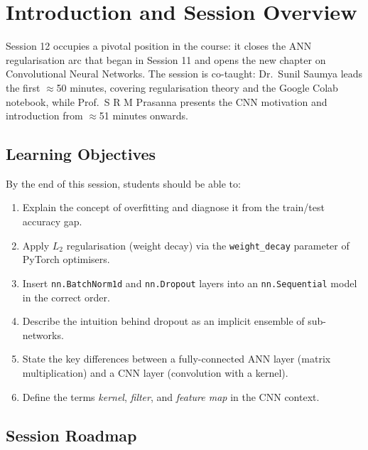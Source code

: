 \documentclass[12pt,a4paper]{article}
\newcommand{\Ltwo}{L_2}
\begin{document}
\tableofcontents
\newpage

\section{Introduction and Session Overview}
\label{sec:intro}

Session 12 occupies a pivotal position in the course: it closes the ANN
regularisation arc that began in Session 11 and opens the new chapter on
Convolutional Neural Networks.  The session is co-taught:
Dr.\ Sunil Saumya leads the first $\approx$50 minutes, covering regularisation
theory and the Google Colab notebook, while Prof.\ S R M Prasanna presents the
CNN motivation and introduction from $\approx$51 minutes onwards.

\subsection{Learning Objectives}
\label{sec:intro:objectives}

By the end of this session, students should be able to:

\begin{enumerate}[label=\textbf{O\arabic*.}]
  \item Explain the concept of overfitting and diagnose it from the
        train/test accuracy gap.
  \item Apply $\Ltwo$ regularisation (weight decay) via the
        \texttt{weight\_decay} parameter of PyTorch optimisers.
  \item Insert \texttt{nn.BatchNorm1d} and \texttt{nn.Dropout} layers into an
        \texttt{nn.Sequential} model in the correct order.
  \item Describe the intuition behind dropout as an implicit ensemble of
        sub-networks.
  \item State the key differences between a fully-connected ANN layer (matrix
        multiplication) and a CNN layer (convolution with a kernel).
  \item Define the terms \emph{kernel}, \emph{filter}, and \emph{feature map}
        in the CNN context.
\end{enumerate}

\subsection{Session Roadmap}
\label{sec:intro:roadmap}
\end{document}
